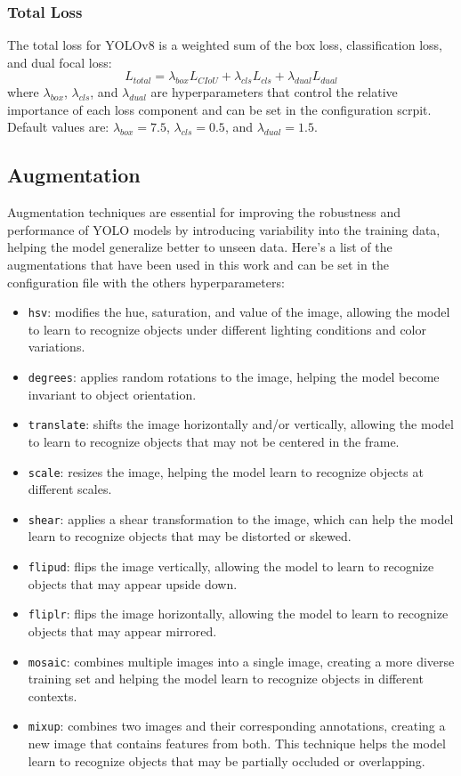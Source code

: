 \subsubsection{Total Loss}
The total loss for YOLOv8 is a weighted sum of the box loss, classification loss, and dual focal loss:
\begin{equation}
    L_{total} = \lambda_{box} L_{CIoU} + \lambda_{cls} L_{cls} + \lambda_{dual} L_{dual}
\end{equation}
where $\lambda_{box}$, $\lambda_{cls}$, and $\lambda_{dual}$ are hyperparameters that control the relative importance of each loss component and can be set in the configuration scrpit. Default values are: $\lambda_{box} = 7.5$, $\lambda_{cls} = 0.5$, and $\lambda_{dual} = 1.5$.

\subsection{Augmentation}
Augmentation techniques are essential for improving the robustness and performance of YOLO models by introducing variability into the training data, helping the model generalize better to unseen data. Here's a list of the augmentations that have been used in this work and can be set in the configuration file with the others hyperparameters:
\begin{itemize}
    \item \texttt{hsv}: modifies the hue, saturation, and value of the image, allowing the model to learn to recognize objects under different lighting conditions and color variations.
    \item \texttt{degrees}: applies random rotations to the image, helping the model become invariant to object orientation. 
    \item \texttt{translate}: shifts the image horizontally and/or vertically, allowing the model to learn to recognize objects that may not be centered in the frame.
    \item \texttt{scale}: resizes the image, helping the model learn to recognize objects at different scales.
    \item \texttt{shear}: applies a shear transformation to the image, which can help the model learn to recognize objects that may be distorted or skewed.
    \item \texttt{flipud}: flips the image vertically, allowing the model to learn to recognize objects that may appear upside down.
    \item \texttt{fliplr}: flips the image horizontally, allowing the model to learn to recognize objects that may appear mirrored.
    \item \texttt{mosaic}: combines multiple images into a single image, creating a more diverse training set and helping the model learn to recognize objects in different contexts.
    \item \texttt{mixup}: combines two images and their corresponding annotations, creating a new image that contains features from both. This technique helps the model learn to recognize objects that may be partially occluded or overlapping.
\end{itemize}
